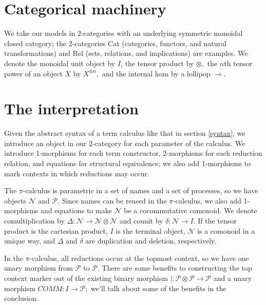\documentclass[]{acm_proc_article-sp}
\newcommand{\maps}{\colon}
\numberwithin{equation}{subsection}
\newcommand{\pic}{$\pi$-calculus}
\begin{document}
\section{Categorical machinery}

We take our models in 2-categories with an underlying symmetric monoidal closed category; the 2-categories Cat (categories, functors, and natural transformations) and Rel (sets, relations, and implications) are examples.  We denote the monoidal unit object by $I$, the tensor product by $\otimes,$ the $n$th tensor power of an object $X$ by $X^{\otimes n},$ and the internal hom by a lollipop $\multimap$.

\section{The interpretation}

Given the abstract syntax of a term calculus like that in section \ref{syntax}, we introduce an object in our 2-category for each parameter of the calculus.  We introduce 1-morphisms for each term constructor, 2-morphisms for each reduction relation, and equations for structural equivalence; we also add 1-morphisms to mark contexts in which reductions may occur.

The {\pic} is parametric in a set of names and a set of processes, so we have objects $\mathcal{N}$ and $\mathcal{P}$.  Since names can be reused in the {\pic,} we also add 1-morphisms and equations to make $\mathcal{N}$ be a cocommutative comonoid.  We denote comultiplication by $\Delta\maps \mathcal{N} \to \mathcal{N} \otimes \mathcal{N}$ and counit by $\delta\maps \mathcal{N} \to I.$  If the tensor product is the cartesian product, $I$ is the terminal object, $\mathcal{N}$ is a comonoid in a unique way, and $\Delta$ and $\delta$ are duplication and deletion, respectively.

In the {\pic,} all reductions occur at the topmost context, so we have one unary morphism from $\mathcal{P}$ to $\mathcal{P}$.  There are some benefits to constructing the top context marker out of the existing binary morphism $|\maps \mathcal{P} \otimes \mathcal{P} \to \mathcal{P}$ and a unary morphism $COMM\maps I \to \mathcal{P};$ we'll talk about some of the benefits in the conclusion.
\end{document}
